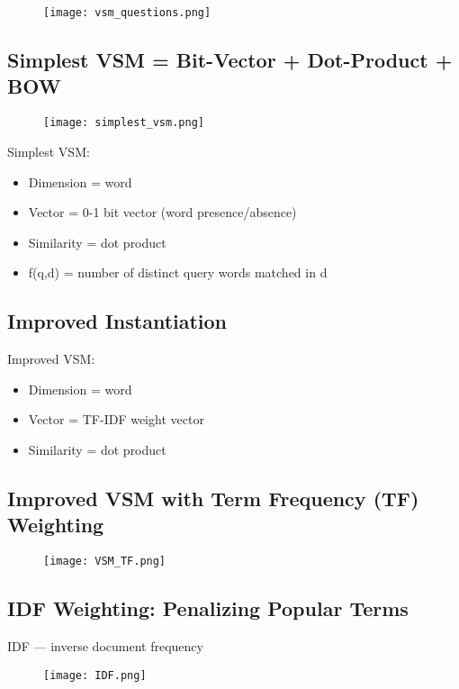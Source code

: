 \begin{figure}[H]
    \centering
    \texttt{[image: vsm\_questions.png]}
\end{figure}


\subsection{Simplest VSM = Bit-Vector + Dot-Product + BOW}
\begin{figure}[H]
    \centering
    \texttt{[image: simplest\_vsm.png]}
\end{figure}

Simplest VSM:
\begin{itemize}
\item Dimension = word
\item Vector = 0-1 bit vector (word presence/absence)
\item Similarity = dot product
\item f(q,d) = number of distinct query words matched in d
\end{itemize}


\subsection{Improved Instantiation}

Improved VSM:
\begin{itemize}
\item Dimension = word
\item Vector = TF-IDF weight vector
\item Similarity = dot product
\end{itemize}

\subsection{Improved VSM with Term Frequency (TF) Weighting}
\begin{figure}[H]
    \centering
    \texttt{[image: VSM\_TF.png]}
\end{figure}

\subsection{IDF Weighting: Penalizing Popular Terms}
IDF — inverse document frequency
\begin{figure}[H]
    \centering
    \texttt{[image: IDF.png]}
\end{figure}

